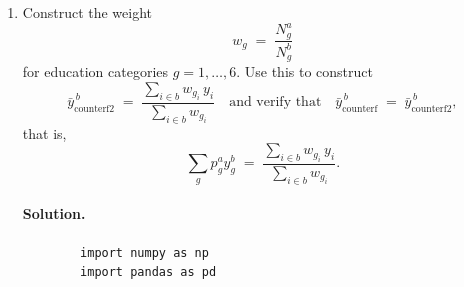\documentclass[12pt]{article}
\numberwithin{equation}{section}
\newcommand{\solution}{\paragraph{Solution.}}
\begin{document}
\begin{enumerate}[leftmargin=2em]
\begin{enumerate}[label=(\alph*),leftmargin=1.6em]
        \paragraph{Interpretation of Part (c).}
        The observed public--private wage gap is
        \[
          \bar{y}^b - \bar{y}^a \;=\; 3.219 - 3.007 \;=\; 0.212.
        \]
        
        Using the Oaxaca decomposition, we compute the counterfactual mean log wage 
        for government workers under the private-sector education distribution:
        \[
          \bar{y}^b_{\text{counterf}} = 3.154.
        \]
        
        This implies an adjusted wage gap of
        \[
          \bar{y}^b_{\text{counterf}} - \bar{y}^a \;=\; 3.154 - 3.007 \;=\; 0.147,
        \]
        which is smaller than the actual observed gap.
        
        Decomposing the total gap of $0.212$, we find:
        \begin{itemize}
          \item \textit{Composition effect (education mix):} $0.065$,
          \item \textit{Returns effect (differences in pay for the same education):} $0.147$.
        \end{itemize}
        
        Thus, approximately $31\%$ of the wage gap can be attributed to differences in 
        the education distribution across sectors, while the remaining $69\%$ reflects 
        differences in returns to education between government and private-sector employment.

    \newpage
    
    \item Construct the weight
    \[
      w_g \;=\; \frac{N_g^a}{N_g^b}
    \]
    for education categories $g=1,\ldots,6$. Use this to construct
    \[
      \bar{y}_{\text{counterf2}}^{\,b}
      \;=\;
      \frac{\sum_{i\in b} w_{g_i}\, y_i}{\sum_{i\in b} w_{g_i}}
      \quad\text{and verify that}\quad
      \bar{y}_{\text{counterf}}^{\,b} \;=\; \bar{y}_{\text{counterf2}}^{\,b},
    \]
    that is,
    \[
      \sum_g p_g^a y_g^b
      \;=\;
      \frac{\sum_{i\in b} w_{g_i}\, y_i}{\sum_{i\in b} w_{g_i}}.
    \]

    \solution
    \begin{listing}[H]
        \begin{verbatim}
        import numpy as np
        import pandas as pd
        

\end{verbatim}
\end{listing}
\end{enumerate}
\end{enumerate}
\end{document}
